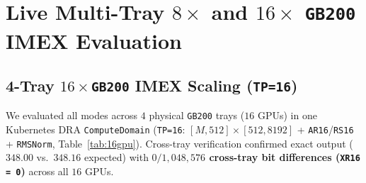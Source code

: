 \documentclass[conference,10pt]{IEEEtran}
\begin{document}
\section{Live Multi-Tray $8{\times}$ and $16{\times}$ \texttt{GB200} IMEX Evaluation}

\subsection{4-Tray $16{\times}$\texttt{GB200} IMEX Scaling (\texttt{TP=16})}
We evaluated all modes across $4$ physical \texttt{GB200} trays ($16$ GPUs) in one Kubernetes DRA \texttt{ComputeDomain} (\texttt{TP=16}: $[M, 512]{\times}[512, 8192]$ + \texttt{AR16}/\texttt{RS16} + \texttt{RMSNorm}, Table~\ref{tab:16gpu}). Cross-tray verification confirmed exact output ($348.00$ vs.\ $348.16$ expected) with \textbf{$0 / 1{,}048{,}576$ cross-tray bit differences (\texttt{XR16 = 0})} across all $16$ GPUs.

\begin{table}[t]
\centering
\caption{Live 4-Tray $16{\times}$\texttt{GB200} IMEX Sweep ($[M,512]{\times}[512,8192]$ + Collective + \texttt{RMSNorm}, Latency in $\mu\text{s}$, \texttt{XR16 = 0}).}
\label{tab:16gpu}
\end{table}
\end{document}
